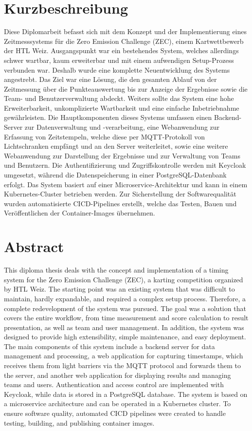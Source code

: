 \section{Kurzbeschreibung}
Diese Diplomarbeit befasst sich mit dem Konzept und der Implementierung eines Zeitmesssystems für die Zero Emission Challenge (ZEC), einem Kartwettbewerb der HTL Weiz.
Ausgangspunkt war ein bestehendes System, welches allerdings schwer wartbar, kaum erweiterbar und mit einem aufwendigen Setup-Prozess verbunden war. Deshalb wurde eine 
komplette Neuentwicklung des Systems angestrebt. Das Ziel war eine Lösung, die den gesamten Ablauf von der Zeitmessung über die Punkteauswertung bis zur Anzeige der Ergebnisse 
sowie die Team- und Benutzerverwaltung abdeckt. Weiters sollte das System eine hohe Erweiterbarkeit, unkomplizierte Wartbarkeit und eine einfache Inbetriebnahme gewährleisten.
Die Hauptkomponenten dieses Systems umfassen einen Backend-Server zur Datenverwaltung und -verarbeitung, eine Webanwendung zur Erfassung von Zeitstempeln, 
welche diese per MQTT-Protokoll von Lichtschranken empfängt und an den Server weiterleitet, sowie eine weitere Webanwendung zur Darstellung der Ergebnisse und 
zur Verwaltung von Teams und Benutzern. Die Authentifizierung und Zugriffskontrolle werden mit Keycloak umgesetzt, während die Datenspeicherung in einer PostgreSQL-Datenbank erfolgt. 
Das System basiert auf einer Microservice-Architektur und kann in einem Kubernetes-Cluster betrieben werden.
Zur Sicherstellung der Softwarequalität wurden automatisierte \gls{CICD}-Pipelines erstellt, welche das Testen, Bauen und Veröffentlichen der Container-Images übernehmen.
\vspace{3.0cm}
\newpage

\section*{Abstract}
This diploma thesis deals with the concept and implementation of a timing system for the Zero Emission Challenge (ZEC), a karting competition organized by HTL Weiz.
The starting point was an existing system that was difficult to maintain, hardly expandable, and required a complex setup process.
Therefore, a complete redevelopment of the system was pursued.
The goal was a solution that covers the entire workflow, from time measurement and score calculation to result presentation, as well as team and user management.
In addition, the system was designed to provide high extensibility, simple maintenance, and easy deployment.
The main components of this system include a backend server for data management and processing, a web application for capturing timestamps, which receives them from light barriers via the MQTT protocol and forwards them to the server, and another web application for displaying results and managing teams and users.
Authentication and access control are implemented with Keycloak, while data is stored in a PostgreSQL database.
The system is based on a microservice architecture and can be operated in a Kubernetes cluster.
To ensure software quality, automated \gls{CICD} pipelines were created to handle testing, building, and publishing container images.
\newpage

